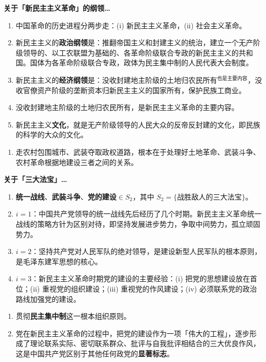 \documentclass[UTF8]{ctexart}
\newcommand\Emph[2]{\colorbox{c#1-light}{\textcolor{c#1-emph}{\textbf{#2}}}}
\begin{document}
\begin{mybox}{2}
\textbf{关于「新民主主义革命」的纲领…}
\begin{enumerate}
  \item 中国革命的历史进程分两步走：(i) 新民主主义革命，(ii) 社会主义革命。
  \item 新民主主义的\Emph{2}{政治纲领}是：推翻帝国主义和封建主义的统治，建立一个无产阶级领导的、以工农联盟为基础的、各革命阶级联合专政的新民主主义的共和国。国体为各革命阶级联合专政，政体为民主集中制的人民代表大会制度。
  \item 新民主主义的\Emph{2}{经济纲领}是：没收封建地主阶级的土地归农民所有$^{\text{也是主要内容}}$，没收官僚资产阶级的垄断资本归新民主主义的国家所有，保护民族工商业。
  \item \textcolor{hydro!60}{没收封建地主阶级的土地归农民所有，是新民主主义革命的主要内容。}
  \item 新民主主义\Emph{2}{文化}，就是无产阶级领导的人民大众的反帝反封建的文化，即民族的科学的大众的文化。
\end{enumerate}
\end{mybox}

\begin{enumerate}[start=16]
  \item 走农村包围城市、武装夺取政权道路，根本在于处理好土地革命、武装斗争、农村革命根据地建设三者之间的关系。
\end{enumerate}

\begin{mybox}{2}
\textbf{关于「三大法宝」…}
\begin{enumerate}
  \item \Emph{2}{统一战线}、\Emph{2}{武装斗争}、\Emph{2}{党的建设}$\in S_2$，其中 $S_2=\{\text{战胜敌人的三大法宝}\}$。
  \item $i=1$：中国共产党领导的统一战线先后经历了几个时期。新民主主义革命统一战线的策略方针为区别对待，即坚持发展进步势力，争取中间势力，孤立顽固势力。
  \item $i=2$：坚持共产党对人民军队的绝对领导，是建设新型人民军队的根本原则，是毛泽东建军思想的核心。
  \item $i=3$：新民主主义革命时期党的建设的主要经验：(i) 把党的思想建设放在首位；(ii) 重视党的组织建设；(iii) 重视党的作风建设；(iv) 必须联系党的政治路线加强党的建设。
\end{enumerate}
\end{mybox}

\begin{enumerate}[start=21]
  \item 贯彻\Emph{2}{民主集中制}这一根本组织原则。
  \item 党在新民主主义革命的过程中，把党的建设作为一项「伟大的工程」，逐步形成了理论联系实际、密切联系群众、批评与自我批评相结合的三大优良作风，这是中国共产党区别于其他任何政党的\Emph{2}{显著标志}。
\end{enumerate}
\end{document}

